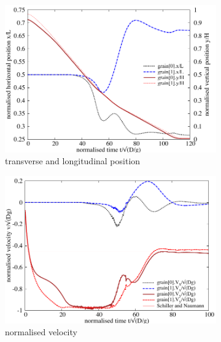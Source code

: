 \begin{figure}[tbhp]
	\centering
	\begin{subfigure}[b]{0.475\textwidth}
		\includegraphics[width=\textwidth]{Kissing_xy}
		\caption{transverse and longitudinal position}
		\label{fig:kissxy}
	\end{subfigure}
	\begin{subfigure}[b]{0.475\textwidth}
		\includegraphics[width=\textwidth]{Kissing_velocity}
		\caption{normalised velocity}
		\label{fig:kissvelocity}
	\end{subfigure}\\
	\begin{subfigure}[b]{0.475\textwidth}

\end{subfigure}
\end{figure}

